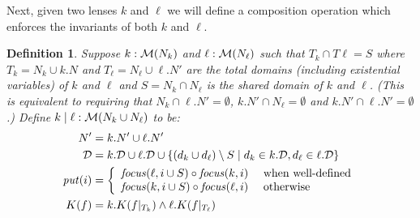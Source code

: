 \documentclass{article}
\newtheorem{definition}{Definition}
\begin{document}
Next, given two lenses $k$ and $\ell$ we will define a composition operation
which enforces the invariants of both $k$ and $\ell$.
\begin{definition}
    Suppose $k : \mathcal M(N_k)$ and $\ell : \mathcal M(N_\ell)$ such that 
    $T_k \cap T\ell = S$ where 
    $T_k = N_k \cup k.N$ and $T_\ell = N_\ell \cup \ell.N'$ are
    the total domains (including existential variables) of $k$ and $\ell$ 
    and $S = N_k \cap N_\ell$ is the shared domain of $k$ and $\ell$.
    (This is equivalent to requiring that $N_k \cap \ell.N' = \emptyset$,
    $k.N' \cap N_\ell = \emptyset$ and $k.N' \cap \ell.N' = \emptyset$.)
    Define $k\mid\ell : \mathcal M(N_k \cup N_\ell)$ to be:
    \begin{align*}
        N' &= k.N' \cup \ell.N' \\
        \mathcal D &= k.\mathcal D \cup \ell.\mathcal D \cup
            \{(d_k \cup d_\ell) \setminus S
            \mid d_k \in k.\mathcal D, d_\ell \in \ell.\mathcal D\} \\
        \mathit{put}(i) &= \left\{\begin{array}{ll}
            \mathit{focus}(\ell,i\cup S) \circ \mathit{focus}(k,i)
                & \mbox{ when well-defined} \\
            \mathit{focus}(k,i\cup S) \circ \mathit{focus}(\ell,i)
                & \mbox{ otherwise}
            \end{array}\right. \\
        K(f) &= k.K(f|_{T_k}) \land \ell.K(f|_{T_\ell})
    \end{align*}
\end{definition}
\end{document}
